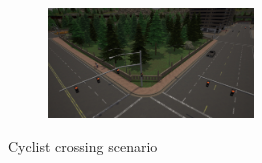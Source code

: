 \documentclass[conference, a4paper, 11pt]{IEEEtran}
\begin{document}
\begin{figure}[h!]
\begin{subfigure}[c]{\textwidth}
    	\captionsetup{width=.6\linewidth}
        \centering
        \includegraphics[width=0.6\textwidth]{figures/generated/cyclist_2.jpg}
    \end{subfigure}
    \caption{Cyclist crossing scenario}
\end{figure}
\end{document}
